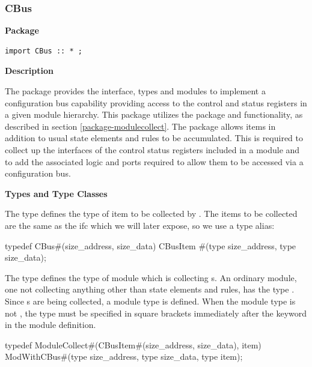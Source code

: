 \subsubsection{CBus}
\label{lib-cbus}

{\bf Package}

\begin{verbatim}
import CBus :: * ;
\end{verbatim}



{\bf Description}

The  package provides the interface, types and modules to
implement a configuration bus capability providing access to the
control and status registers in a given module hierarchy.  This
package  utilizes the
 package and functionality,  as described in section
\ref{package-modulecollect}.  The  package allows
items in addition to usual state elements and rules to be accumulated.
This is required to collect up the interfaces of the control status
registers included in a module and to add the associated logic and
ports required to allow them to be accessed via a configuration bus.




{\bf Types and Type Classes}

The type  defines the type of item to be collected by
.   The items to be collected are the same as the
ifc which we will later expose, so we use a type alias:

\begin{libverbatim}
typedef CBus#(size_address, size_data) 
        CBusItem #(type size_address, type size_data);
\end{libverbatim}

The type  defines the type of module which is
collecting s.  An ordinary module, one not collecting anything
other than state elements and rules, has the type .   Since
s are
being collected, a  module type  is
defined.  When the module  type is not , 
the  type  must
be specified in square brackets immediately after the 
keyword in  the module definition. 

\begin{libverbatim}
typedef ModuleCollect#(CBusItem#(size_address, size_data), item) 
        ModWithCBus#(type size_address, type size_data, type item);
\end{libverbatim}



